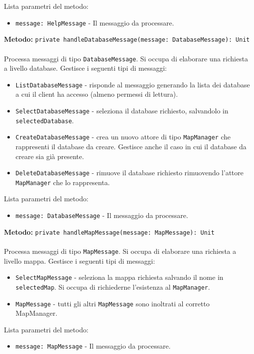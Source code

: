 \documentclass[a4paper]{article}
\begin{document}
			Lista parametri del metodo:
			\begin{itemize}
				\item \texttt{message: HelpMessage} - Il messaggio da processare.
			\end{itemize}			
		\textbf{Metodo: }\texttt{private handleDatabaseMessage(message: DatabaseMessage): Unit}
			\\ \\
			Processa messaggi di tipo \texttt{DatabaseMessage}. Si occupa di elaborare una richiesta a livello database.
			Gestisce i seguenti tipi di messaggi:
			\begin{itemize}
				\item \texttt{ListDatabaseMessage} - risponde al messaggio generando la lista dei database a cui il client ha accesso (almeno permessi di lettura).
				\item \texttt{SelectDatabaseMessage} - seleziona il database richiesto, salvandolo in \texttt{selectedDatabase}.
				\item \texttt{CreateDatabaseMessage} - crea un nuovo attore di tipo \texttt{MapManager} che rappresenti il database da creare. Gestisce anche il caso in cui il database da creare sia già presente.
				\item \texttt{DeleteDatabaseMessage} - rimuove il database richiesto rimuovendo l'attore \texttt{MapManager} che lo rappresenta.
			\end{itemize}
			Lista parametri del metodo:
			\begin{itemize}
				\item \texttt{message: DatabaseMessage} - Il messaggio da processare.
			\end{itemize}	
		\textbf{Metodo: }\texttt{private handleMapMessage(message: MapMessage): Unit}
			\\ \\
			Processa messaggi di tipo \texttt{MapMessage}. Si occupa di elaborare una richiesta a livello mappa.
			Gestisce i seguenti tipi di messaggi:
			\begin{itemize}
				\item \texttt{SelectMapMessage} - seleziona la mappa richiesta salvando il nome in \texttt{selectedMap}. Si occupa di richiederne l'esistenza al \texttt{MapManager}.
				\item \texttt{MapMessage} - tutti gli altri \texttt{MapMessage} sono inoltrati al corretto MapManager.
			\end{itemize}
			Lista parametri del metodo:
			\begin{itemize}
				\item \texttt{message: MapMessage} - Il messaggio da processare.
			\end{itemize}	
\end{document}
